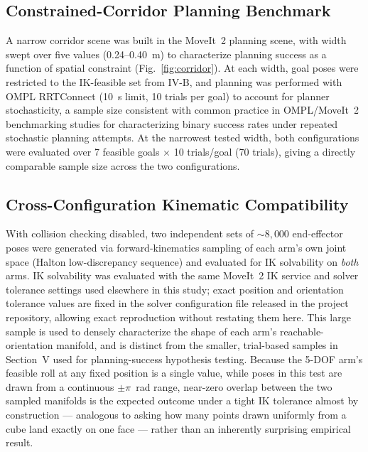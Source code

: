 \documentclass[conference]{IEEEtran}
\begin{document}
	\subsection{Constrained-Corridor Planning Benchmark}
	
	A narrow corridor scene was built in the MoveIt~2 planning scene,
	with width swept over five values (0.24--0.40~m) to characterize
	planning success as a function of spatial constraint
	(Fig.~\ref{fig:corridor}). At each width, goal poses were restricted
	to the IK-feasible set from IV-B, and planning was performed with
	OMPL RRTConnect (10~s limit, 10 trials per goal) to account for
	planner stochasticity, a sample size consistent with common practice
	in OMPL/MoveIt~2 benchmarking studies for characterizing binary
	success rates under repeated stochastic planning attempts. At the
	narrowest tested width, both configurations were evaluated over 7
	feasible goals $\times$ 10 trials/goal (70 trials), giving a directly
	comparable sample size across the two configurations.
	
	\subsection{Cross-Configuration Kinematic Compatibility}
	
	With collision checking disabled, two independent sets of
	${\sim}8{,}000$ end-effector poses were generated via
	forward-kinematics sampling of each arm's own joint space (Halton
	low-discrepancy sequence) and evaluated for IK solvability on
	\emph{both} arms. IK solvability was evaluated with the same
	MoveIt~2 IK service and solver tolerance settings used elsewhere in
	this study; exact position and orientation tolerance values are
	fixed in the solver configuration file released in the project
	repository, allowing exact reproduction without restating them
	here. This
	large sample is used to densely characterize the shape of each arm's
	reachable-orientation manifold, and is distinct from the smaller,
	trial-based samples in Section~V used for planning-success hypothesis
	testing. Because the 5-DOF arm's feasible roll at any fixed position
	is a single value, while poses in this test are drawn from a
	continuous $\pm\pi$~rad range, near-zero overlap between the two
	sampled manifolds is the expected outcome under a tight IK tolerance
	almost by construction — analogous to asking how many points drawn
	uniformly from a cube land exactly on one face — rather than an
	inherently surprising empirical result.
	
\end{document}
